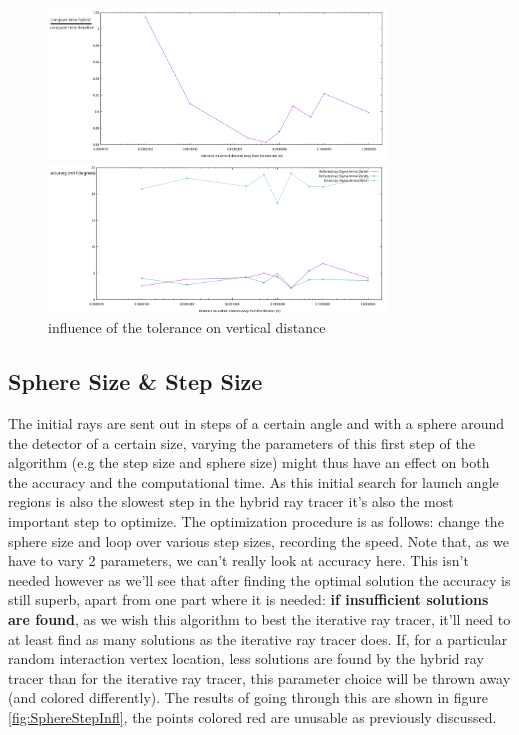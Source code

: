 \begin{figure}
	\centering
	\begin{minipage}{\textwidth}
		\includegraphics[width=0.8\textwidth]{figures/ZtolVsTime2.pdf}
	\end{minipage}
	\begin{minipage}{\textwidth}
		\includegraphics[width=0.8\textwidth]{figures/ZtolVsSigmaAZ.pdf}
	\end{minipage}
\caption{influence of the tolerance on vertical distance}
\label{fig:ztolinfl2}
\end{figure}

\subsection{Sphere Size \& Step Size}
The initial rays are sent out in steps of a certain angle and with a sphere
around the detector of a certain size, varying the parameters of this first
step of the algorithm (e.g the step size and sphere size) might thus have an
effect on both the accuracy and the computational time.  As this initial search
for launch angle regions is also the slowest step in the hybrid ray tracer it's
also the most important step to optimize. The optimization procedure is as
follows: change the sphere size and loop over various step sizes, recording the
speed. Note that, as we have to vary 2 parameters, we can't really look at
accuracy here. This isn't needed however as we'll see that after finding the
optimal solution the accuracy is still superb, apart from one part where it is
needed: \textbf{if insufficient solutions are found}, as we wish this algorithm
to best the iterative ray tracer, it'll need to at least find as many solutions
as the iterative ray tracer does.  If, for a particular random interaction
vertex location, less solutions are found by the hybrid ray tracer than for the
iterative ray tracer, this parameter choice will be thrown away (and colored
differently).  The results of going through this are shown in figure
\ref{fig:SphereStepInfl}, the points colored red are unusable as previously
discussed.

